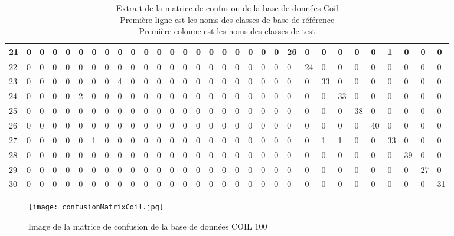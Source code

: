 \documentclass[french,12pt,a4paper,oneside,notitlepage]{report}
\begin{document}
\begin{table}[!ht]
\begin{center}
{\begin{tabular}{|l|l|l|l|l|l|l|l|l|l|l|l|l|l|l|l|l|l|l|l|l|l|l|l|l|l|l|l|l|l|l|}
\hline
21&0&0&0&0&0&0&0&0&0&0&0&0&0&0&0&0&0&0&0&0&26&0&0&0&0&0&1&0&0&0\\
\hline
22&0&0&0&0&0&0&0&0&0&0&0&0&0&0&0&0&0&0&0&0&0&24&0&0&0&0&0&0&0&0\\
\hline
23&0&0&0&0&0&0&0&4&0&0&0&0&0&0&0&0&0&0&0&0&0&0&33&0&0&0&0&0&0&0\\
\hline
24&0&0&0&0&2&0&0&0&0&0&0&0&0&0&0&0&0&0&0&0&0&0&0&33&0&0&0&0&0&0\\
\hline
25&0&0&0&0&0&0&0&0&0&0&0&0&0&0&0&0&0&0&0&0&0&0&0&0&38&0&0&0&0&0\\
\hline
26&0&0&0&0&0&0&0&0&0&0&0&0&0&0&0&0&0&0&0&0&0&0&0&0&0&40&0&0&0&0\\
\hline
27&0&0&0&0&0&1&0&0&0&0&0&0&0&0&0&0&0&0&0&0&0&0&1&1&0&0&33&0&0&0\\
\hline
28&0&0&0&0&0&0&0&0&0&0&0&0&0&0&0&0&0&0&0&0&0&0&0&0&0&0&0&39&0&0\\
\hline
29&0&0&0&0&0&0&0&0&0&0&0&0&0&0&0&0&0&0&0&0&0&0&0&0&0&0&0&0&27&0\\
\hline
30&0&0&0&0&0&0&0&0&0&0&0&0&0&0&0&0&0&0&0&0&0&0&0&0&0&0&0&0&0&31\\
\hline
	    \end{tabular}
	}
	\caption {Extrait de la matrice de confusion de la base de données Coil\\
	\hspace*{1.7cm}  Première ligne est les noms des classes de base de référence\\
	\hspace*{1.7cm}  Première colonne est les noms des classes de test}
	\end{center}
\end{table}
\begin{figure}[h!]
\begin{center}
 \texttt{[image: confusionMatrixCoil.jpg]}
\end{center}
 \caption{Image de la matrice de confusion de la base de données COIL 100}
\end{figure}
\clearpage
\end{document}
